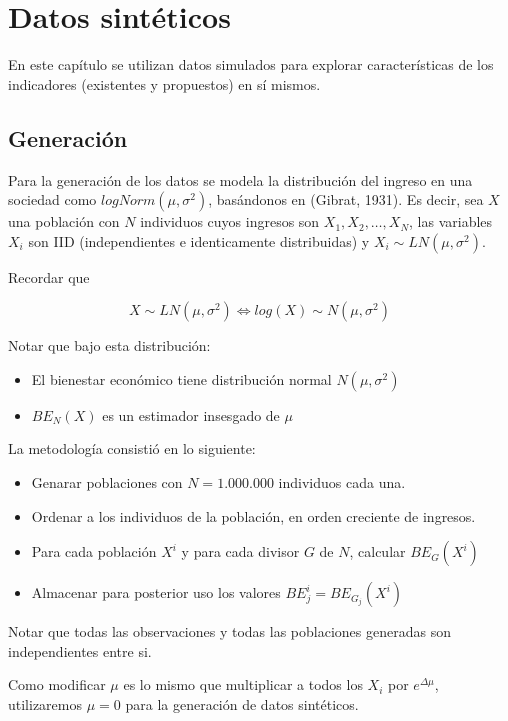 \chapter{Datos sintéticos} \label{chapter:datos_sinteticos}

En este capítulo se utilizan datos simulados para explorar características de los indicadores (existentes y propuestos) en sí mismos.

\section{Generación}

Para la generación de los datos se modela la distribución del ingreso en una sociedad como $logNorm(\mu,\sigma^2)$, basándonos en (Gibrat, 1931)\cite{gibrat1931inégalités}. Es decir, sea $X$ una población con $N$ individuos cuyos ingresos son $X_1, X_2, \dots, X_N$, las variables $X_i$ son IID (independientes e identicamente distribuidas) y $X_i \sim LN(\mu, \sigma^2)$.

Recordar que 

$$
    X \sim LN(\mu, \sigma^2) \iff log(X) \sim N(\mu,\sigma^2)
$$

Notar que bajo esta distribución:

\begin{itemize}
    \item El bienestar económico tiene distribución normal $N(\mu,\sigma^2)$
    \item $BE_N(X)$ es un estimador insesgado de $\mu$
\end{itemize}

La metodología consistió en lo siguiente:

\begin{itemize}
    \item Genarar poblaciones con $N = 1.000.000$ individuos cada una.
    \item Ordenar a los individuos de la población, en orden creciente de ingresos.
    \item Para cada población $X^i$ y para cada divisor $G$ de $N$, calcular $BE_G(X^i)$
    \item Almacenar para posterior uso los valores $BE_j^i = BE_{G_j}(X^i)$
\end{itemize}

Notar que todas las observaciones y todas las poblaciones generadas son independientes entre si.

Como modificar $\mu$ es lo mismo que multiplicar a todos los $X_i$ por $e^{\Delta \mu}$, utilizaremos $\mu = 0$ para la generación de datos sintéticos.

